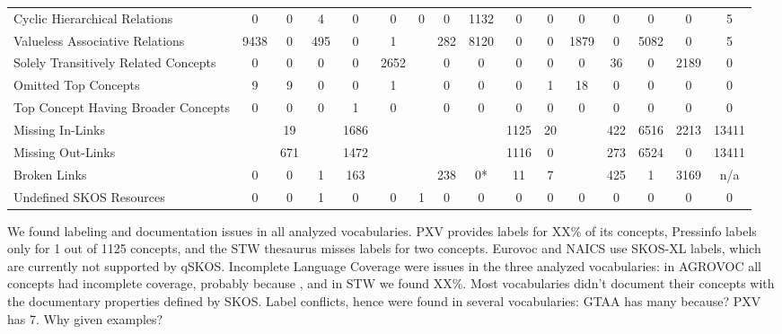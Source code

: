 \begin{table}[h]
\begin{center}
{\begin{tabular}{p{4cm}ccccccccccccccc}
Cyclic Hierarchical Relations & 0 & 0 & 4 & 0 & 0 & 0 & 0 & 1132 & 0 & 0 & 0 & 0 & 0 & 0 & 5 \\

Valueless Associative Relations & 9438 & 0 & 495 & 0 & 1 && 282 & 8120 & 0 & 0 & 1879 & 0 & 5082 & 0 & 5 \\

Solely Transitively Related Concepts & 0 & 0 & 0 & 0 & 2652 && 0 & 0 & 0 & 0 & 0 & 36 & 0 & 2189 & 0 \\

Omitted Top Concepts & 9 & 9 & 0 & 0 & 1 && 0 & 0 & 0 & 1 & 18 & 0 & 0 & 0 & 0 \\

Top Concept Having Broader Concepts & 0 & 0 & 0 & 1 & 0 && 0 & 0 & 0 & 0 & 0 & 0 & 0 & 0 & 0 \\

\midrule

Missing In-Links && 19 && 1686 &&&&& 1125 & 20 && 422 & 6516 & 2213 & 13411 \\

Missing Out-Links && 671 && 1472 &&&&& 1116 & 0 && 273 & 6524 & 0 & 13411 \\

Broken Links & 0 & 0 & 1 & 163 &&& 238 & 0* & 11 & 7 && 425 & 1 & 3169 & n/a \\


Undefined SKOS Resources & 0 & 0 & 1 & 0 & 0 & 1 & 0 & 0 & 0 & 0 & 0 & 0 & 0 & 0 & 0  \\

\bottomrule
\end{tabular}
}
\end{center}
\end{table}

We found labeling and documentation issues in all analyzed vocabularies. PXV provides labels for XX\% of its concepts, Pressinfo labels only for 1 out of 1125 concepts, and the STW thesaurus misses labels for two concepts. Eurovoc and NAICS use SKOS-XL labels, which are currently not supported by qSKOS.
Incomplete Language Coverage were issues in the three analyzed vocabularies: in AGROVOC all concepts had incomplete coverage, probably because , and in STW we found XX\%.
Most vocabularies didn't document their concepts with the documentary properties defined by SKOS.
Label conflicts, hence  were found in several vocabularies: GTAA has many because? PXV has 7. Why given examples?

